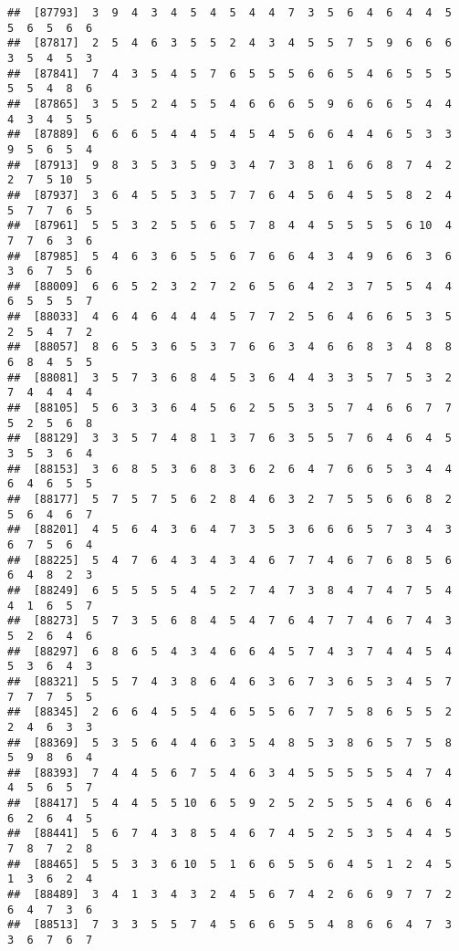 \documentclass[
]{book}
\begin{document}
\begin{verbatim}
##  [87793]  3  9  4  3  4  5  4  5  4  4  7  3  5  6  4  6  4  4  5  5  6  5  6  6
##  [87817]  2  5  4  6  3  5  5  2  4  3  4  5  5  7  5  9  6  6  6  3  5  4  5  3
##  [87841]  7  4  3  5  4  5  7  6  5  5  5  6  6  5  4  6  5  5  5  5  5  4  8  6
##  [87865]  3  5  5  2  4  5  5  4  6  6  6  5  9  6  6  6  5  4  4  4  3  4  5  5
##  [87889]  6  6  6  5  4  4  5  4  5  4  5  6  6  4  4  6  5  3  3  9  5  6  5  4
##  [87913]  9  8  3  5  3  5  9  3  4  7  3  8  1  6  6  8  7  4  2  2  7  5 10  5
##  [87937]  3  6  4  5  5  3  5  7  7  6  4  5  6  4  5  5  8  2  4  5  7  7  6  5
##  [87961]  5  5  3  2  5  5  6  5  7  8  4  4  5  5  5  5  6 10  4  7  7  6  3  6
##  [87985]  5  4  6  3  6  5  5  6  7  6  6  4  3  4  9  6  6  3  6  3  6  7  5  6
##  [88009]  6  6  5  2  3  2  7  2  6  5  6  4  2  3  7  5  5  4  4  6  5  5  5  7
##  [88033]  4  6  4  6  4  4  4  5  7  7  2  5  6  4  6  6  5  3  5  2  5  4  7  2
##  [88057]  8  6  5  3  6  5  3  7  6  6  3  4  6  6  8  3  4  8  8  6  8  4  5  5
##  [88081]  3  5  7  3  6  8  4  5  3  6  4  4  3  3  5  7  5  3  2  7  4  4  4  4
##  [88105]  5  6  3  3  6  4  5  6  2  5  5  3  5  7  4  6  6  7  7  5  2  5  6  8
##  [88129]  3  3  5  7  4  8  1  3  7  6  3  5  5  7  6  4  6  4  5  3  5  3  6  4
##  [88153]  3  6  8  5  3  6  8  3  6  2  6  4  7  6  6  5  3  4  4  6  4  6  5  5
##  [88177]  5  7  5  7  5  6  2  8  4  6  3  2  7  5  5  6  6  8  2  5  6  4  6  7
##  [88201]  4  5  6  4  3  6  4  7  3  5  3  6  6  6  5  7  3  4  3  6  7  5  6  4
##  [88225]  5  4  7  6  4  3  4  3  4  6  7  7  4  6  7  6  8  5  6  6  4  8  2  3
##  [88249]  6  5  5  5  5  4  5  2  7  4  7  3  8  4  7  4  7  5  4  4  1  6  5  7
##  [88273]  5  7  3  5  6  8  4  5  4  7  6  4  7  7  4  6  7  4  3  5  2  6  4  6
##  [88297]  6  8  6  5  4  3  4  6  6  4  5  7  4  3  7  4  4  5  4  5  3  6  4  3
##  [88321]  5  5  7  4  3  8  6  4  6  3  6  7  3  6  5  3  4  5  7  7  7  7  5  5
##  [88345]  2  6  6  4  5  5  4  6  5  5  6  7  7  5  8  6  5  5  2  2  4  6  3  3
##  [88369]  5  3  5  6  4  4  6  3  5  4  8  5  3  8  6  5  7  5  8  5  9  8  6  4
##  [88393]  7  4  4  5  6  7  5  4  6  3  4  5  5  5  5  5  4  7  4  4  5  6  5  7
##  [88417]  5  4  4  5  5 10  6  5  9  2  5  2  5  5  5  4  6  6  4  6  2  6  4  5
##  [88441]  5  6  7  4  3  8  5  4  6  7  4  5  2  5  3  5  4  4  5  7  8  7  2  8
##  [88465]  5  5  3  3  6 10  5  1  6  6  5  5  6  4  5  1  2  4  5  1  3  6  2  4
##  [88489]  3  4  1  3  4  3  2  4  5  6  7  4  2  6  6  9  7  7  2  6  4  7  3  6
##  [88513]  7  3  3  5  5  7  4  5  6  6  5  5  4  8  6  6  4  7  3  3  6  7  6  7

\end{verbatim}
\end{document}
